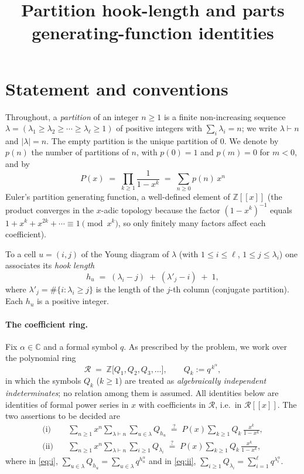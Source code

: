 \documentclass[12pt]{article}
\title{Partition hook-length and parts generating-function identities}
\author{}
\date{}
\theoremstyle{definition}
\begin{document}
\maketitle

\section{Statement and conventions}

Throughout, a \emph{partition} of an integer $n\ge1$ is a finite non-increasing
sequence $\lambda=(\lambda_1\ge\lambda_2\ge\cdots\ge\lambda_\ell\ge1)$ of positive
integers with $\sum_i\lambda_i=n$; we write $\lambda\vdash n$ and $|\lambda|=n$. The
empty partition is the unique partition of $0$. We denote by $p(n)$ the number of
partitions of $n$, with $p(0)=1$ and $p(m)=0$ for $m<0$, and by
\begin{equation}\label{eq:Pdef}
P(x)\;=\;\prod_{k\ge1}\frac{1}{1-x^k}\;=\;\sum_{n\ge0}p(n)\,x^n
\end{equation}
Euler's partition generating function, a well-defined element of $\mathbb{Z}[[x]]$
(the product converges in the $x$-adic topology because the factor $(1-x^k)^{-1}$
equals $1+x^k+x^{2k}+\cdots\equiv 1\pmod{x^k}$, so only finitely many factors affect
each coefficient).

To a cell $u=(i,j)$ of the Young diagram of $\lambda$ (with $1\le i\le\ell$,
$1\le j\le\lambda_i$) one associates its \emph{hook length}
\begin{equation}\label{eq:hook}
h_u\;=\;(\lambda_i-j)\;+\;(\lambda'_j-i)\;+\;1,
\end{equation}
where $\lambda'_j=\#\{i:\lambda_i\ge j\}$ is the length of the $j$-th column
(conjugate partition). Each $h_u$ is a positive integer.

\paragraph{The coefficient ring.}
Fix $\alpha\in\mathbb C$ and a formal symbol $q$. As prescribed by the problem, we
work over the polynomial ring
\begin{equation}\label{eq:ring}
\mathcal R\;=\;\mathbb Z\big[Q_1,Q_2,Q_3,\dots\big],
\qquad Q_k:=q^{\,k^{\alpha}},
\end{equation}
in which the symbols $Q_k$ ($k\ge1$) are treated as \emph{algebraically independent
indeterminates}; no relation among them is assumed. All identities below are
identities of formal power series in $x$ with coefficients in $\mathcal R$, i.e.\ in
$\mathcal R[[x]]$. The two assertions to be decided are
\begin{align}
\text{(i)}\quad
&\sum_{n\ge1}x^n\sum_{\lambda\vdash n}\sum_{u\in\lambda} Q_{h_u}
\;\overset{?}{=}\;
P(x)\sum_{k\ge1} Q_k\,\frac{x^k}{1-x^k},
\label{eq:i}\\[1mm]
\text{(ii)}\quad
&\sum_{n\ge1}x^n\sum_{\lambda\vdash n}\sum_{i\ge1} Q_{\lambda_i}
\;\overset{?}{=}\;
P(x)\sum_{k\ge1} Q_k\,\frac{x^k}{1-x^k},
\label{eq:ii}
\end{align}
where in \eqref{eq:i}, $\sum_{u\in\lambda}Q_{h_u}=\sum_{u\in\lambda}q^{h_u^\alpha}$
and in \eqref{eq:ii}, $\sum_{i\ge1}Q_{\lambda_i}=\sum_{i=1}^{\ell}q^{\lambda_i^\alpha}$.
\end{document}
